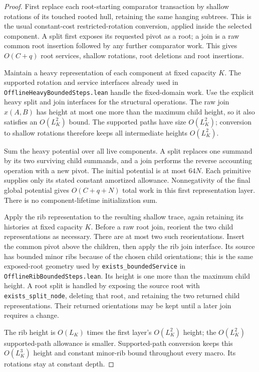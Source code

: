\documentclass[11pt]{article}
\begin{document}
\begin{proof}
First replace each root-starting comparator transaction by shallow
rotations of its touched rooted hull, retaining the same hanging
subtrees. This is the usual constant-cost restricted-rotation conversion,
applied inside the selected component. A split first exposes its
requested pivot as a root; a join is a raw common root insertion followed
by any further comparator work. This gives $O(C+q)$ root services,
shallow rotations, root deletions and root insertions.

Maintain a heavy representation of each component at fixed capacity
$K$. The supported rotation and service interfaces already used in
\texttt{OfflineHeavyBoundedSteps.lean} handle the fixed-domain work.
Use the explicit heavy split and join interfaces for the structural
operations. The raw join $x(A,B)$ has height at most one more than the
maximum child height, so it also satisfies an $O(L_K^2)$ bound.
The supported paths have size $O(L_K^2)$; conversion to shallow rotations
therefore keeps all intermediate heights $O(L_K^2)$.

Sum the heavy potential over all live components. A split replaces one
summand by its two surviving child summands, and a join performs the
reverse accounting operation with a new pivot. The initial potential is
at most $64N$. Each primitive supplies only its stated constant
amortized allowance. Nonnegativity of the final global potential gives
$O(C+q+N)$ total work in this first representation layer. There is no
component-lifetime initialization sum.

Apply the rib representation to the resulting shallow trace, again
retaining its histories at fixed capacity $K$. Before a raw root join,
reorient the two child representations as necessary. There are at most
two such reorientations. Insert the common pivot above the children,
then apply the rib join interface. Its source has bounded minor ribs
because of the chosen child orientations; this is the same exposed-root
geometry used by \texttt{exists\_boundedService} in
\texttt{OfflineRibBoundedSteps.lean}. Its height is one more than the
maximum child height. A root split is handled by exposing the source
root with \texttt{exists\_split\_node}, deleting that root, and retaining
the two returned child representations. Their returned orientations may
be kept until a later join requires a change.

The rib height is $O(L_K)$ times the first layer's $O(L_K^2)$ height;
the $O(L_K^2)$ supported-path allowance is smaller. Supported-path
conversion keeps this $O(L_K^3)$ height and constant minor-rib bound
throughout every macro. Its rotations stay at constant depth.


\end{proof}
\end{document}
